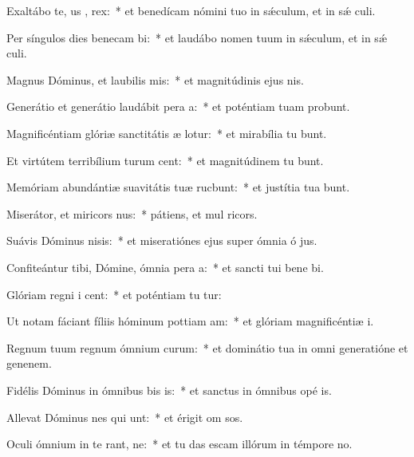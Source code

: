 \item Exaltábo te, us , rex:~* et benedícam nómini tuo in sǽculum, et in sǽ culi.
\item Per síngulos dies benecam bi:~* et laudábo nomen tuum in sǽculum, et in sǽ culi.
\item Magnus Dóminus, et laubilis mis:~* et magnitúdinis ejus   nis.
\item Generátio et generátio laudábit pera a:~* et poténtiam tuam probunt.
\item Magnificéntiam glóriæ sanctitátis æ lotur:~* et mirabília tu bunt.
\item Et virtútem terribílium turum cent:~* et magnitúdinem tu bunt.
\item Memóriam abundántiæ suavitátis tuæ rucbunt:~* et justítia tua bunt.
\item Miserátor, et miricors nus:~* pátiens, et mul ricors.
\item Suávis Dóminus nisis:~* et miseratiónes ejus super ómnia ó jus.
\item Confiteántur tibi, Dómine, ómnia pera a:~* et sancti tui bene bi.
\item Glóriam regni i cent:~* et poténtiam tu tur:
\item Ut notam fáciant fíliis hóminum pottiam am:~* et glóriam magnificéntiæ  i.
\item Regnum tuum regnum ómnium curum:~* et dominátio tua in omni generatióne et genenem.
\item Fidélis Dóminus in ómnibus bis is:~* et sanctus in ómnibus opé is.
\item Allevat Dóminus nes qui unt:~* et érigit om sos.
\item Oculi ómnium in te rant, ne:~* et tu das escam illórum in témpore no.
